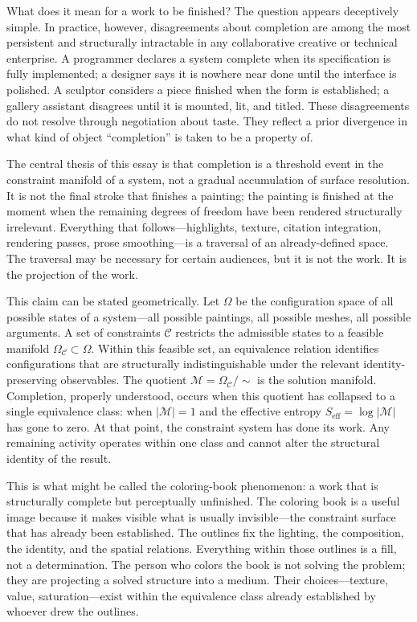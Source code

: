\documentclass[12pt, twoside]{article}
\theoremstyle{plain}
\theoremstyle{definition}
\theoremstyle{remark}
\newcommand{\OmC}{\Omega_{\mathcal{C}}}
\newcommand{\Seff}{S_{\text{eff}}}
\begin{document}
What does it mean for a work to be finished? The question appears deceptively simple. In practice, however, disagreements about completion are among the most persistent and structurally intractable in any collaborative creative or technical enterprise. A programmer declares a system complete when its specification is fully implemented; a designer says it is nowhere near done until the interface is polished. A sculptor considers a piece finished when the form is established; a gallery assistant disagrees until it is mounted, lit, and titled. These disagreements do not resolve through negotiation about taste. They reflect a prior divergence in what kind of object ``completion'' is taken to be a property of.

The central thesis of this essay is that completion is a threshold event in the constraint manifold of a system, not a gradual accumulation of surface resolution. It is not the final stroke that finishes a painting; the painting is finished at the moment when the remaining degrees of freedom have been rendered structurally irrelevant. Everything that follows---highlights, texture, citation integration, rendering passes, prose smoothing---is a traversal of an already-defined space. The traversal may be necessary for certain audiences, but it is not the work. It is the projection of the work.

This claim can be stated geometrically. Let $\Omega$ be the configuration space of all possible states of a system---all possible paintings, all possible meshes, all possible arguments. A set of constraints $\mathcal{C}$ restricts the admissible states to a feasible manifold $\OmC \subset \Omega$. Within this feasible set, an equivalence relation identifies configurations that are structurally indistinguishable under the relevant identity-preserving observables. The quotient $\mathcal{M} = \OmC / {\sim}$ is the solution manifold. Completion, properly understood, occurs when this quotient has collapsed to a single equivalence class: when $|\mathcal{M}| = 1$ and the effective entropy $\Seff = \log |\mathcal{M}|$ has gone to zero. At that point, the constraint system has done its work. Any remaining activity operates within one class and cannot alter the structural identity of the result.

This is what might be called the coloring-book phenomenon: a work that is structurally complete but perceptually unfinished. The coloring book is a useful image because it makes visible what is usually invisible---the constraint surface that has already been established. The outlines fix the lighting, the composition, the identity, and the spatial relations. Everything within those outlines is a fill, not a determination. The person who colors the book is not solving the problem; they are projecting a solved structure into a medium. Their choices---texture, value, saturation---exist within the equivalence class already established by whoever drew the outlines.
\end{document}
